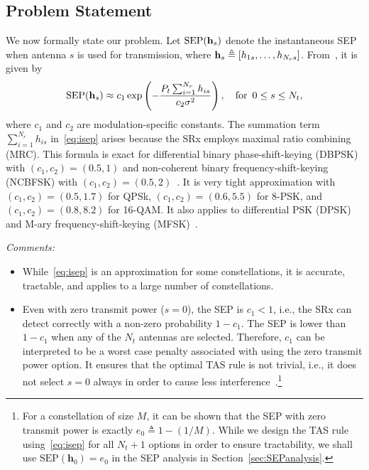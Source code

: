 \documentclass[12pt,draftcls,peerreview,onecolumn]{IEEEtran}
\newcommand{\define}{\triangleq}
\newcommand{\ie}{{i.e.}}
\newcommand{\SEP}{\text{SEP}}
\newcommand{\nx}{{0}}
\newcommand{\Nt}{{N_t}}
\newcommand{\Nr}{{N_r}}
\newcommand{\Pt}{{P_t}}
\newcommand{\such}{h}
\newcommand{\hk}[1]{{\such_{#1}}}
\newcommand{\h}{\mathbf{\such}}
\newcommand{\noisevar}{\sigma^2}
\newcommand{\cone}{c_{1}}
\newcommand{\ctwo}{c_{2}}
\newcommand{\zerosep}{e_0}
\newcommand{\sumnr}{\sum_{i=1}^{\Nr}}
\begin{document}
\subsection{Problem Statement}
We now formally state our problem. Let $\SEP(\hs)$ denote the instantaneous SEP when antenna $s$ is used for transmission, where $\hs\define\left[\hk{1s},\ldots,\hk{\Nr s} \right]$. From~\cite[(14)]{Chung_2001_TCom}, it is given by  
\begin{equation}
\SEP(\hs) \approx \cone \exp\left({-\frac{\Pt\sumnr\hk{is}}{\ctwo\noisevar} }\right), \quad\text{for} \,\,\, 0\leq s \leq \Nt,
\label{eq:isep}
\end{equation} 
where $\cone$ and $\ctwo$ are modulation-specific constants. The summation term $\sumnr\hk{is}$ in~\eqref{eq:isep} arises because the SRx employs maximal ratio combining (MRC). This formula is exact for differential binary phase-shift-keying (DBPSK) with $(\cone,\ctwo) = (0.5,1)$  and non-coherent binary frequency-shift-keying (NCBFSK) with  $(\cone,\ctwo) = (0.5,2)$~\cite{Fakhan_2014_TSP}. It is very tight approximation with $(\cone,\ctwo )=(0.5,1.7)$ for QPSk,  $(\cone,\ctwo)=(0.6,5.5)$ for 8-PSK, and  $(\cone,\ctwo )=(0.8,8.2)$ for 16-QAM. It also applies to differential PSK (DPSK) and M-ary frequency-shift-keying (MFSK)~\cite{simon_alouini_book}.


{\em Comments:}
\begin{itemize}
\item While~\eqref{eq:isep} is an approximation for some constellations,  it is accurate, tractable, and applies to a large number of constellations. %
\item Even with zero transmit power ($s=\nx$), the SEP is $\cone<1$, \ie, the SRx can detect correctly with a non-zero probability $1-\cone$. The SEP is lower than $1-\cone$ when any of the $\Nt$ antennas are selected. Therefore, $\cone$ can be interpreted to be a worst case penalty associated with using the zero transmit power option. It ensures that the optimal TAS rule is not trivial, \ie, it does not select $s=\nx$  always in order to cause less interference~\cite{Kashyap_2014_TCOM,Sarvendranath_2013_TCOM,Sarvendranath_2014_TCOM}.\footnote{For a constellation of size $M$, it can be shown that the SEP with zero transmit power is exactly $\zerosep\define 1-\left(1/M\right)$. While we design the TAS rule using~\eqref{eq:isep} for all $\Nt+1$ options in order to ensure tractability, we shall use $\SEP(\h_0) = \zerosep$ in the SEP analysis in Section~\ref{sec:SEPanalysis}. } 	
\end{itemize}
\end{document}
